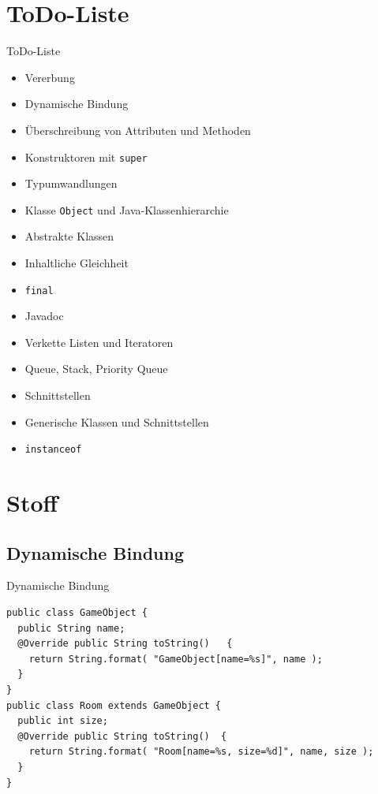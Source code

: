 \documentclass[18pt]{beamer}
\begin{document}
\section{ToDo-Liste}
\begin{frame}[fragile]{ToDo-Liste}
\begin{itemize}
 \item Vererbung \checkmark
 \item Dynamische Bindung
 \item Überschreibung von Attributen und Methoden \checkmark
 \item Konstruktoren mit \verb|super| \checkmark
 \item Typumwandlungen 
 \item Klasse \verb|Object| und Java-Klassenhierarchie
 \item Abstrakte Klassen
 \item Inhaltliche Gleichheit
 \item \verb|final|
 \item Javadoc \checkmark
 \item Verkette Listen und Iteratoren
 \item Queue, Stack, Priority Queue
 \item Schnittstellen \checkmark
 \item Generische Klassen und Schnittstellen \checkmark
  \item \verb|instanceof|
\end{itemize}
\end{frame}



\section{Stoff}
\subsection{Dynamische Bindung}
\begin{frame}[fragile]{Dynamische Bindung}

 \begin{lstlisting}
public class GameObject {
  public String name;
  @Override public String toString()   {
    return String.format( "GameObject[name=%s]", name );
  }
}
public class Room extends GameObject {
  public int size;
  @Override public String toString()  {
    return String.format( "Room[name=%s, size=%d]", name, size );
  }
} \end{lstlisting}

\end{frame}
\end{document}
